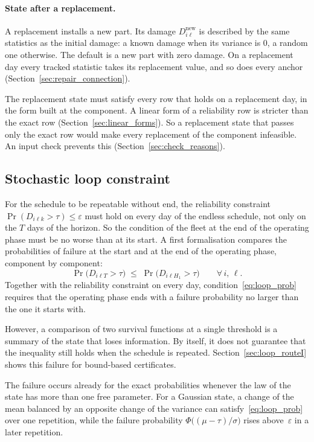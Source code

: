 \documentclass[11pt,a4paper]{article}
\theoremstyle{plain}
\theoremstyle{definition}
\theoremstyle{remark}
\begin{document}
\paragraph{State after a replacement.}
A replacement installs a new part.
Its damage $D^{\mathrm{new}}_{i\ell}$ is described by the same statistics as the initial damage: a known damage when its variance is $0$, a random one otherwise.
The default is a new part with zero damage.
On a replacement day every tracked statistic takes its replacement value, and so does every anchor (Section~\ref{sec:repair_connection}).

The replacement state must satisfy every row that holds on a replacement day, in the form built at the component.
A linear form of a reliability row is stricter than the exact row (Section~\ref{sec:linear_forms}).
So a replacement state that passes only the exact row would make every replacement of the component infeasible.
An input check prevents this (Section~\ref{sec:check_reasons}).

\subsection{Stochastic loop constraint}
\label{sec:loop_constraint}

For the schedule to be repeatable without end, the reliability constraint $\Pr(D_{i\ell k} > \tau) \le \varepsilon$ must hold on every day of the endless schedule, not only on the $T$ days of the horizon.
So the condition of the fleet at the end of the operating phase must be no worse than at its start.
A first formalisation compares the probabilities of failure at the start and at the end of the operating phase, component by component:
\begin{equation}\label{eq:loop_prob}
  \Pr\!\bigl(D_{i\ell T} > \tau\bigr)
  \;\le\;
  \Pr\!\bigl(D_{i\ell H_1} > \tau\bigr)
  \qquad \forall\, i,\,\ell.
\end{equation}
Together with the reliability constraint on every day, condition~\eqref{eq:loop_prob} requires that the operating phase ends with a failure probability no larger than the one it starts with.

However, a comparison of two survival functions at a single threshold is a summary of the state that loses information.
By itself, it does not guarantee that the inequality still holds when the schedule is repeated.
Section~\ref{sec:loop_routeI} shows this failure for bound-based certificates.

The failure occurs already for the exact probabilities whenever the law of the state has more than one free parameter.
For a Gaussian state, a change of the mean balanced by an opposite change of the variance can satisfy~\eqref{eq:loop_prob} over one repetition, while the failure probability $\Phi\bigl((\mu-\tau)/\sigma\bigr)$ rises above~$\varepsilon$ in a later repetition.
\end{document}
